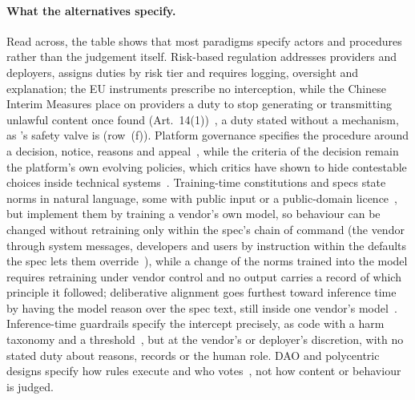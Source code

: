 \paragraph{What the alternatives specify.}
Read across, the table shows that most paradigms specify actors and procedures rather than the judgement itself.
Risk-based regulation addresses providers and deployers, assigns duties by risk tier and requires logging, oversight and explanation; the EU instruments prescribe no interception, while the Chinese Interim Measures place on providers a duty to stop generating or transmitting unlawful content once found (Art.~14(1))~\cite{cac2023genai}, a duty stated without a mechanism, as \pol{}'s safety valve is (row~(f)).
Platform governance specifies the procedure around a decision, notice, reasons and appeal~\cite{dsa2022,santaclara2021,klonick2020oversight}, while the criteria of the decision remain the platform's own evolving policies, which critics have shown to hide contestable choices inside technical systems~\cite{gorwa2020algorithmic,gillespie2018custodians}.
Training-time constitutions and specs state norms in natural language, some with public input or a public-domain licence~\cite{huang2024collective,openai2025modelspec}, but implement them by training a vendor's own model, so behaviour can be changed without retraining only within the spec's chain of command (the vendor through system messages, developers and users by instruction within the defaults the spec lets them override~\cite{openai2025modelspec}), while a change of the norms trained into the model requires retraining under vendor control and no output carries a record of which principle it followed; deliberative alignment goes furthest toward inference time by having the model reason over the spec text, still inside one vendor's model~\cite{guan2024deliberative}.
Inference-time guardrails specify the intercept precisely, as code with a harm taxonomy and a threshold~\cite{inan2023llama,markov2023holistic,rebedea2023nemo,dong2025safeguarding}, but at the vendor's or deployer's discretion, with no stated duty about reasons, records or the human role.
DAO and polycentric designs specify how rules execute and who votes~\cite{buterin2014ethereum,hassan2021decentralized,santana2022blockchain,ostrom1990governing,makridis2025polycentric}, not how content or behaviour is judged.

